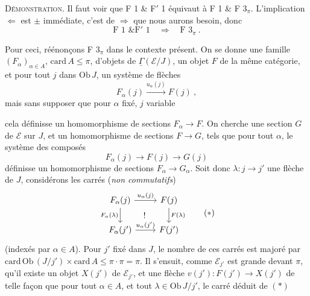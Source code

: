 \documentclass[11pt]{article}
\newcommand{\printedpage}[1]{\marginpar{\footnotesize p.~#1}}
\newcommand{\msp}[1]{\marginpar{\footnotesize [#1]}}
\newcommand{\uGamma}{\underline{\Gamma}}
\newcommand{\Ob}{\mathrm{Ob}\,}
\newcommand{\card}{\mathrm{card}\,}
\begin{document}
\textsc{Démonstration}. Il faut voir que F 1 \& F$'$ 1 équivaut à F 1 \& F $3_\pi$. L'implication $\Longleftarrow$ est $\pm$ immédiate, c'est de $\Longrightarrow$ que nous aurons besoin, donc
\[
\text{F 1 \& F}'\text{ 1} \quad\Longrightarrow\quad \text{F } 3_\pi\ .
\]

\printedpage{95}
Pour ceci, réénonçons F $3_\pi$ dans le contexte présent. On se donne une famille $(F_\alpha)_{\alpha\in A}$, $\card A\leqslant\pi$, d'objets de $\uGamma(\mathcal{E}/J)$, un objet $F$ de la même catégorie, et pour tout $j$ dans $\Ob J$, un système de flèches
\[
F_\alpha(j) \xrightarrow{u_\alpha(j)} F(j)\ ,
\]
mais sans supposer que pour $\alpha$ fixé, $j$ variable

\msp{252}
cela définisse un homomorphisme de sections $F_\alpha\longrightarrow F$. On cherche une section $G$ de $\mathcal{E}$ sur $J$, et un homomorphisme de sections $F\longrightarrow G$, tels que pour tout $\alpha$, le système des composés
\[
F_\alpha(j) \longrightarrow F(j) \longrightarrow G(j)
\]
définisse un homomorphisme de sections $F_\alpha\longrightarrow G_\alpha$. Soit donc $\lambda : j\longrightarrow j'$ une flèche de $J$, considérons les carrés (\textit{non commutatifs}) %
\[
\begin{tikzcd}
F_\alpha(j) \arrow[r,"u_\alpha(j)"] \arrow[d,"F_\alpha(\lambda)"'] \arrow[dr,phantom,"!"] & F(j) \arrow[d,"F(\lambda)"] \\
F_\alpha(j') \arrow[r,"u_\alpha(j')"] & F(j')
\end{tikzcd}
\tag*{$(*)$}
\]
(indexés par $\alpha\in A$). Pour $j'$ fixé dans $J$, le nombre de ces carrés est majoré par $\card\Ob(J/j')\times\card A\leqslant\pi\cdot\pi=\pi$. Il s'ensuit, comme $\mathcal{E}_{j'}$ est grande devant $\pi$, qu'il existe un objet $X(j')$ de $\mathcal{E}_{j'}$, et une flèche $v(j') : F(j')\longrightarrow X(j')$ de telle façon que pour tout $\alpha\in A$, et tout $\lambda\in\Ob J/j'$, le carré déduit de $(*)$
\end{document}
